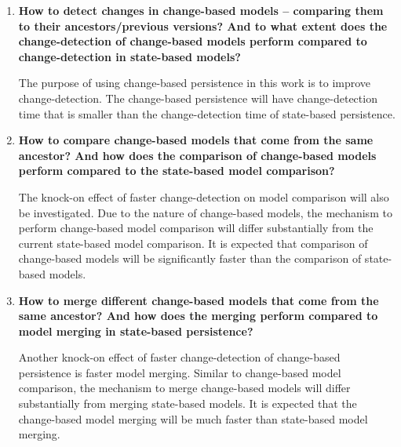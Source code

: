\documentclass[12pt, a4paper]{report} \usepackage[titletoc]{appendix}
\begin{document}
\begin{enumerate}
    \item \textbf{How to detect changes in change-based models -- comparing them to their ancestors/previous versions? And to what extent does the change-detection of change-based models perform compared to change-detection in state-based models?} 
        
    The purpose of using change-based persistence in this work is to improve change-detection. The change-based persistence will have change-detection time that is smaller than the change-detection time of state-based persistence.        
	
	\item \textbf{How to compare change-based models that come from the same ancestor? And how does the comparison of change-based models perform compared to the state-based model comparison?} 
	
	The knock-on effect of faster change-detection on model comparison will also be investigated. Due to the nature of change-based models, the mechanism to perform change-based model comparison will differ substantially from the current state-based model comparison. It is expected that comparison of change-based models will be significantly faster than the comparison of state-based models.   
	
	\item \textbf{How to merge different change-based models that come from the same ancestor? And how does the merging perform compared to model merging in state-based persistence?}
	
	Another knock-on effect of faster change-detection of change-based persistence is faster model merging. Similar to change-based model comparison, the mechanism to merge change-based models will differ substantially from merging state-based models. It is expected that the change-based model merging will be much faster than state-based model merging.   
	
\end{enumerate}
\end{document}
